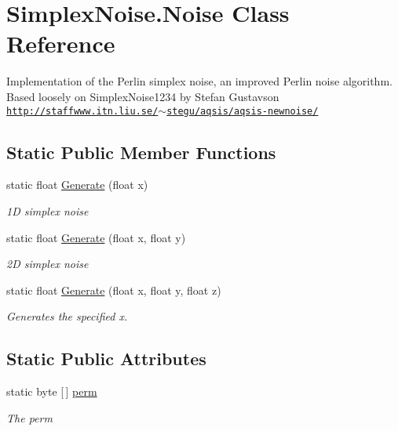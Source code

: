 \hypertarget{class_simplex_noise_1_1_noise}{}\section{Simplex\+Noise.\+Noise Class Reference}
\label{class_simplex_noise_1_1_noise}


Implementation of the Perlin simplex noise, an improved Perlin noise algorithm. Based loosely on Simplex\+Noise1234 by Stefan Gustavson \href{http://staffwww.itn.liu.se/~stegu/aqsis/aqsis-newnoise/}{\tt http\+://staffwww.\+itn.\+liu.\+se/$\sim$stegu/aqsis/aqsis-\/newnoise/}  


\subsection*{Static Public Member Functions}
\begin{DoxyCompactItemize}
\item 
static float \hyperlink{class_simplex_noise_1_1_noise_ab06f7e36078de3f6e050464076fae245}{Generate} (float x)
\begin{DoxyCompactList}\small\item\em 1D simplex noise \end{DoxyCompactList}\item 
static float \hyperlink{class_simplex_noise_1_1_noise_a4f34ca0d2996f9ea0d3a05eba853a6bd}{Generate} (float x, float y)
\begin{DoxyCompactList}\small\item\em 2D simplex noise \end{DoxyCompactList}\item 
static float \hyperlink{class_simplex_noise_1_1_noise_a46452242b3e8610a365c32b5c4f0ecc7}{Generate} (float x, float y, float z)
\begin{DoxyCompactList}\small\item\em Generates the specified x. \end{DoxyCompactList}\end{DoxyCompactItemize}
\subsection*{Static Public Attributes}
\begin{DoxyCompactItemize}
\item 
static byte \mbox{[}$\,$\mbox{]} \hyperlink{class_simplex_noise_1_1_noise_ae8332871ecf7d21682b4a415edbbb5da}{perm}
\begin{DoxyCompactList}\small\item\em The perm \end{DoxyCompactList}\end{DoxyCompactItemize}


